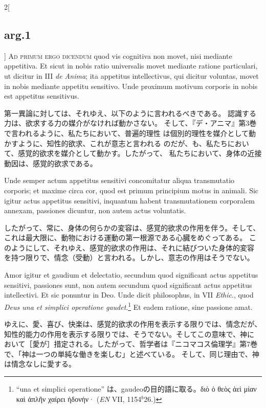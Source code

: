 \documentclass[paper=a4paper,fontsize=10pt,jafontsize=9pt,titlepage]{jlreq}
\begin{document}
\begin{paracol}{2}[\subsection{arg.1}]
{\scshape Ad primum ergo dicendum} quod vis cognitiva
non movet, nisi mediante appetitiva. Et sicut in nobis ratio universalis
movet mediante ratione particulari, ut dicitur in III {\itshape de Anima}; ita
appetitus intellectivus, qui dicitur voluntas, movet in nobis mediante
appetitu sensitivo. Unde proximum motivum corporis in nobis est
appetitus sensitivus.

\switchcolumn

第一異論に対しては、それゆえ、以下のように言われるべきである。
 認識する力は、欲求する力の媒介がなければ動かさない。
 そして、『デ・アニマ』第3巻で言われるように、私たちにおいて、普遍的理性
 は個別的理性を媒介として動かすように、知性的欲求、これが意志と言われる
 のだが、も、私たちにおいて、感覚的欲求を媒介として動かす。したがって、
 私たちにおいて、身体の近接動因は、感覚的欲求である。

\switchcolumn*


Unde semper actum appetitus sensitivi concomitatur
aliqua transmutatio corporis; et maxime circa cor, quod est primum
principium motus in animali. Sic igitur actus appetitus sensitivi,
inquantum habent transmutationem corporalem annexam, passiones dicuntur,
non autem actus voluntatis.

\switchcolumn

したがって、常に、身体の何らかの変容は、感覚的欲求の作用を伴う。そして、
 これは最大限に、動物における運動の第一根源である心臓をめぐってある。
このようにして、それゆえ、感覚的欲求の作用は、それに結びついた身体的変容
 を持つ限りで、情念（受動）と言われる。しかし、意志の作用はそうでない。

\switchcolumn*


Amor igitur et gaudium et delectatio,
secundum quod significant actus appetitus sensitivi, passiones sunt, non
autem secundum quod significant actus appetitus intellectivi. Et sic
ponuntur in Deo. Unde dicit philosophus, in VII {\itshape Ethic}., quod {\itshape Deus una et
 simplici operatione gaudet}.\footnote{ ``una et simplici operatione''
 は、gaudeoの目的語に取る。διὸ ὁ θεὸς ἀεὶ μίαν καὶ ἁπλῆν χαίρει ἡδονήν·
({\itshape EN} VII, 1154$^b$26.)
}
Et eadem ratione, sine passione amat.

\switchcolumn

ゆえに、愛、喜び、快楽は、感覚的欲求の作用を表示する限りでは、情念だが、
 知性的能力の作用を表示する限りでは、そうでない。そしてこの意味で、神に
 おいて［愛が］措定される。したがって、哲学者は『ニコマコス倫理学』第7巻
 で、「神は一つの単純な働きを楽しむ」と述べている。
そして、同じ理由で、神は情念なしに愛する。


\end{paracol}
\end{document}
